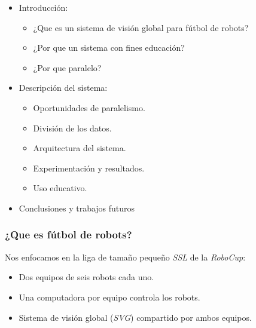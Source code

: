 \documentclass[11pt,a4paper,spanish]{beamer}
\begin{document}
\begin{frame}

\begin{itemize}

\item Introducción:

\begin{itemize}

	\item ¿Que es un sistema de visión global para fútbol de robots?

	\item ¿Por que un sistema con fines educación?

	\item ¿Por que paralelo?

\end{itemize}

\item Descripción del sistema:

\begin{itemize}

	\item Oportunidades de paralelismo.

	\item División de los datos.

	\item Arquitectura del sistema.

	\item Experimentación y resultados.

	\item Uso educativo.

\end{itemize}

\item Conclusiones y trabajos futuros

\end{itemize}

\end{frame}

\begin{frame}

\frametitle{¿Que es fútbol de robots?}

	Nos enfocamos en la liga de tamaño pequeño \emph{SSL} de la
	\emph{RoboCup}:

\begin{itemize}

	\item Dos equipos de seis robots cada uno.

	\item Una computadora por equipo controla los robots.

	\item Sistema de visión global (\emph{SVG}) compartido por ambos
		equipos.

\end{itemize}

\end{frame}
\end{document}
